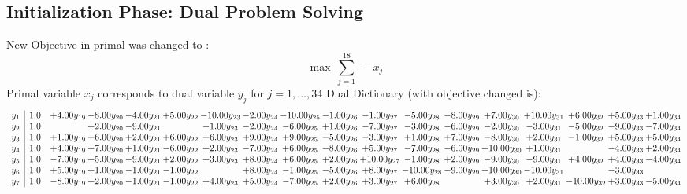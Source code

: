 \documentclass[9pt]{article}
\begin{document}
\subsection{Initialization Phase: Dual Problem Solving}
New Objective in primal was changed to : \[ \max\ \sum_{j=1}^{18}\ - x_j \] 
Primal variable $x_j$ corresponds to dual variable $y_j$ for $j = 1,\ldots,34$
Dual Dictionary (with objective changed is): 
\[\begin{array}{c| c c@{\hskip 2pt} c@{\hskip 2pt} c@{\hskip 2pt} c@{\hskip 2pt} c@{\hskip 2pt} c@{\hskip 2pt} c@{\hskip 2pt} c@{\hskip 2pt} c@{\hskip 2pt} c@{\hskip 2pt} c@{\hskip 2pt} c@{\hskip 2pt} c@{\hskip 2pt} c@{\hskip 2pt} c@{\hskip 2pt} c@{\hskip 2pt} }
 y_{1}   &  1.0 & +  4.00 y_{19} & -8.00 y_{20} & -4.00 y_{21} & +  5.00 y_{22} & -10.00 y_{23} & -2.00 y_{24} & -10.00 y_{25} & -1.00 y_{26} & -1.00 y_{27} & -5.00 y_{28} & -8.00 y_{29} & +  7.00 y_{30} & + 10.00 y_{31} & +  6.00 y_{32} & +  5.00 y_{33} & +  1.00 y_{34}\\
 y_{2}   &  1.0  &   & +  2.00 y_{20} & -9.00 y_{21} &   & -1.00 y_{23} & -2.00 y_{24} & -6.00 y_{25} & +  1.00 y_{26} & -7.00 y_{27} & -3.00 y_{28} & -6.00 y_{29} & -2.00 y_{30} & -3.00 y_{31} & -5.00 y_{32} & -9.00 y_{33} & -7.00 y_{34}\\
 y_{3}   &  1.0 & +  1.00 y_{19} & +  6.00 y_{20} & +  2.00 y_{21} & +  6.00 y_{22} & +  6.00 y_{23} & +  9.00 y_{24} & +  9.00 y_{25} & -5.00 y_{26} & -3.00 y_{27} & +  1.00 y_{28} & +  7.00 y_{29} & -8.00 y_{30} & +  2.00 y_{31} & -1.00 y_{32} & +  5.00 y_{33} & +  5.00 y_{34}\\
 y_{4}   &  1.0 & +  4.00 y_{19} & +  7.00 y_{20} & +  1.00 y_{21} & -6.00 y_{22} & +  2.00 y_{23} & -7.00 y_{24} & +  6.00 y_{25} & -8.00 y_{26} & +  5.00 y_{27} & -7.00 y_{28} & -6.00 y_{29} & + 10.00 y_{30} & +  1.00 y_{31} &   & -4.00 y_{33} & +  2.00 y_{34}\\
 y_{5}   &  1.0 & -7.00 y_{19} & +  5.00 y_{20} & -9.00 y_{21} & +  2.00 y_{22} & +  3.00 y_{23} & +  8.00 y_{24} & +  6.00 y_{25} & +  2.00 y_{26} & + 10.00 y_{27} & -1.00 y_{28} & +  2.00 y_{29} & -9.00 y_{30} & -9.00 y_{31} & +  4.00 y_{32} & +  4.00 y_{33} & -4.00 y_{34}\\
 y_{6}   &  1.0 & +  5.00 y_{19} & +  1.00 y_{20} & -1.00 y_{21} & -1.00 y_{22} &   & +  8.00 y_{24} & -1.00 y_{25} & -5.00 y_{26} & +  8.00 y_{27} & -10.00 y_{28} & -9.00 y_{29} & + 10.00 y_{30} & -10.00 y_{31} &   & -3.00 y_{33} &   \\
 y_{7}   &  1.0 & -8.00 y_{19} & +  2.00 y_{20} & -1.00 y_{21} & -1.00 y_{22} & +  4.00 y_{23} & +  5.00 y_{24} & -7.00 y_{25} & +  2.00 y_{26} & +  3.00 y_{27} & +  6.00 y_{28} &   & +  3.00 y_{30} & +  2.00 y_{31} & -10.00 y_{32} & +  3.00 y_{33} & -5.00 y_{34}\\

\end{array}\]
\end{document}
